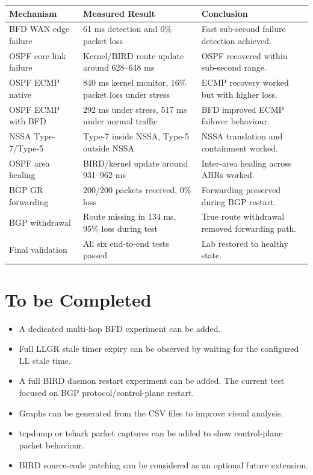 \documentclass[12pt,a4paper]{article}
\begin{document}
\begin{longtable}{|p{4cm}|p{4cm}|p{6cm}|}
\hline
\textbf{Mechanism} & \textbf{Measured Result} & \textbf{Conclusion} \\
\hline
BFD WAN edge failure & 61 ms detection and 0\% packet loss & Fast sub-second failure detection achieved. \\
\hline
OSPF core link failure & Kernel/BIRD route update around 628--648 ms & OSPF recovered within sub-second range. \\
\hline
OSPF ECMP native & 840 ms kernel monitor, 16\% packet loss under stress & ECMP recovery worked but with higher loss. \\
\hline
OSPF ECMP with BFD & 292 ms under stress, 517 ms under normal traffic & BFD improved ECMP failover behaviour. \\
\hline
NSSA Type-7/Type-5 & Type-7 inside NSSA, Type-5 outside NSSA & NSSA translation and containment worked. \\
\hline
OSPF area healing & BIRD/kernel update around 931--962 ms & Inter-area healing across ABRs worked. \\
\hline
BGP GR forwarding & 200/200 packets received, 0\% loss & Forwarding preserved during BGP restart. \\
\hline
BGP withdrawal & Route missing in 134 ms, 95\% loss during test & True route withdrawal removed forwarding path. \\
\hline
Final validation & All six end-to-end tests passed & Lab restored to healthy state. \\
\hline
\end{longtable}

\section{To be Completed}

\begin{itemize}
    \item A dedicated multi-hop BFD experiment can be added.
    \item Full LLGR stale timer expiry can be observed by waiting for the configured LL stale time.
    \item A full BIRD daemon restart experiment can be added. The current test focused on BGP protocol/control-plane restart.
    \item Graphs can be generated from the CSV files to improve visual analysis.
    \item tcpdump or tshark packet captures can be added to show control-plane packet behaviour.
    \item BIRD source-code patching can be considered as an optional future extension.
\end{itemize}
\end{document}
